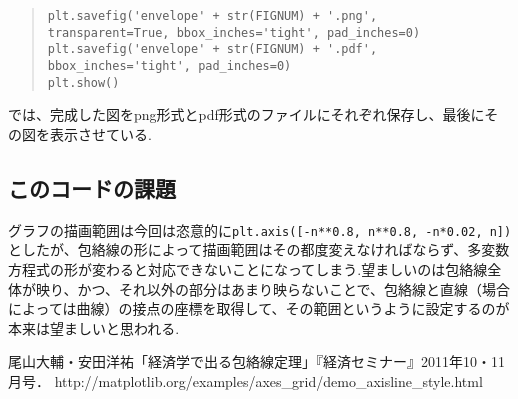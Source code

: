 \documentclass[11pt,a4j,fleqn]{jarticle}
\begin{document}
\begin{quote}
\begin{verbatim}
plt.savefig('envelope' + str(FIGNUM) + '.png', 
transparent=True, bbox_inches='tight', pad_inches=0)
plt.savefig('envelope' + str(FIGNUM) + '.pdf', 
bbox_inches='tight', pad_inches=0)
plt.show()
\end{verbatim}
\end{quote}
では、完成した図をpng形式とpdf形式のファイルにそれぞれ保存し、最後にその図を表示させている.

\subsection{このコードの課題}
グラフの描画範囲は今回は恣意的に\verb|plt.axis([-n**0.8, n**0.8, -n*0.02, n])|としたが、包絡線の形によって描画範囲はその都度変えなければならず、多変数方程式の形が変わると対応できないことになってしまう.望ましいのは包絡線全体が映り、かつ、それ以外の部分はあまり映らないことで、包絡線と直線（場合によっては曲線）の接点の座標を取得して、その範囲というように設定するのが本来は望ましいと思われる.

\begin{thebibliography}{0}
尾山大輔・安田洋祐「経済学で出る包絡線定理」『経済セミナー』2011年10・11月号．
http://matplotlib.org/examples/axes\_grid/demo\_axisline\_style.html
\end{thebibliography}
\end{document}
